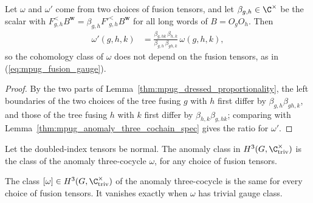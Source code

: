 \begin{lemma}
    \label{thm:mpug_anomaly_three_cocycle_gauge}
    \leanok
    Let $\omega$ and $\omega'$ come from two choices of fusion tensors, and
    let $\beta_{g,h}\in\C^\times$ be the scalar with
    $F^<_{g,h}B^{\mathbf w}=\beta_{g,h}F'^<_{g,h}B^{\mathbf w}$ for all long
    words of $B=O_gO_h$. Then
    \begin{align}
        \omega'(g,h,k)
         & =\frac{\beta_{g,hk}\,\beta_{h,k}}{\beta_{g,h}\,\beta_{gh,k}}
        \,\omega(g,h,k),
    \end{align}
    so the cohomology class of $\omega$ does not depend on the fusion
    tensors, as in (\ref{eq:mpug_fusion_gauge}).
\end{lemma}

\begin{proof}\leanok
    By the two parts of Lemma~\ref{thm:mpug_dressed_proportionality}, the
    left boundaries of the two choices of the tree fusing $g$ with $h$
    first differ by $\beta_{g,h}\beta_{gh,k}$, and those of the tree fusing
    $h$ with $k$ first differ by $\beta_{h,k}\beta_{g,hk}$; comparing with
    Lemma~\ref{thm:mpug_anomaly_three_cochain_spec} gives the ratio for
    $\omega'$.
\end{proof}

\begin{definition}
    \label{def:mpug_anomaly_class}
    \leanok
    Let the doubled-index tensors be normal. The anomaly class in
    $H^3(G,\C^\times_{\mathrm{triv}})$ is the class of the anomaly
    three-cocycle $\omega$, for any choice of fusion tensors.
\end{definition}

\begin{corollary}
    \label{cor:mpug_anomaly_class}
    \leanok
    The class $[\omega]\in H^3(G,\C^\times_{\mathrm{triv}})$ of the anomaly
    three-cocycle is the same for every choice of fusion tensors. It vanishes
    exactly when $\omega$ has trivial gauge class.
\end{corollary}


